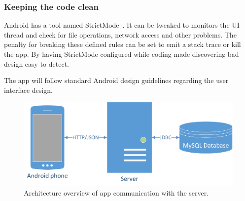 \subsubsection{Keeping the code clean}

Android has a tool named StrictMode~\cite{androidStrictMode}. It can be tweaked to monitors the UI thread and check for file operations, network access and other problems. The penalty for breaking these defined rules can be set to emit a stack trace or kill the app. By having StrictMode configured while coding made discovering bad design easy to detect. 

The app will follow standard Android design guidelines regarding the user interface design.


\begin{figure}[H]
\includegraphics[width=\textwidth]{ch/architecture/fig/arch.png}
\caption{Architecture overview of app communication with the server.}
\label{fig:architecture}
\end{figure}
